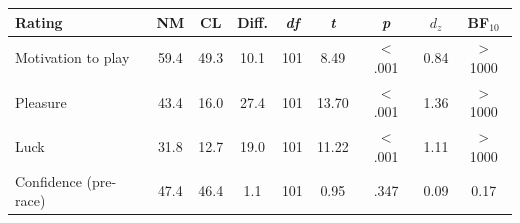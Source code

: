 \begin{tabular}{lcccccccc}
\toprule
Rating & NM & CL & Diff. & \textit{df} & \textit{t} & \textit{p} & $d_z$ & BF$_{10}$ \\
\midrule
Motivation to play & 59.4 & 49.3 & 10.1 & 101 & 8.49 & $<$ .001 & 0.84 & > 1000 \\
Pleasure & 43.4 & 16.0 & 27.4 & 101 & 13.70 & $<$ .001 & 1.36 & > 1000 \\
Luck & 31.8 & 12.7 & 19.0 & 101 & 11.22 & $<$ .001 & 1.11 & > 1000 \\
Confidence (pre-race) & 47.4 & 46.4 & 1.1 & 101 & 0.95 & .347 & 0.09 & 0.17 \\
\bottomrule
\end{tabular}
